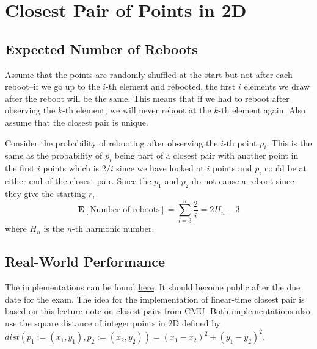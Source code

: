 \section{Closest Pair of Points in 2D}

\subsection{Expected Number of Reboots}

Assume that the points are randomly shuffled at the start but not after each reboot--if we go up to the $i$-th element and rebooted, the first $i$ elements we draw after the reboot will be the same. This means that if we had to reboot after observing the $k$-th element, we will never reboot at the $k$-th element again. Also assume that the closest pair is unique.

Consider the probability of rebooting after observing the $i$-th point $p_i$. This is the same as the probability of $p_i$ being part of a closest pair with another point in the first $i$ points which is $2/i$ since we have looked at $i$ points and $p_i$ could be at either end of the closest pair. Since the $p_1$ and $p_2$ do not cause a reboot since they give the starting $r$,
\[
  \mathbf{E}[\text{Number of reboots}] = \sum_{i=3}^n \frac{2}{i} = 2H_n - 3
\]
where $H_n$ is the $n$-th harmonic number.

\subsection{Real-World Performance}

The implementations can be found \href{https://github.com/nngerncham/cs315_private/tree/main/final/cp_code02}{here}. It should become public after the due date for the exam. The idea for the implementation of linear-time closest pair is based on \href{https://www.cs.cmu.edu/~15451-s15/LectureNotes/lecture16/closest-pair.pdf}{this lecture note} on closest pairs from CMU. Both implementations also use the square distance of integer points in 2D defined by $dist(p_1 := (x_1, y_1), p_2 := (x_2, y_2)) = (x_1 - x_2)^2 + (y_1 - y_2)^2$.
